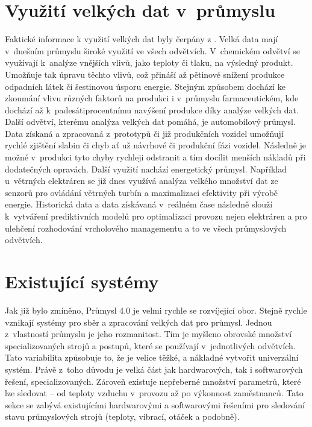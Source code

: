 \section{Využití velkých dat v~průmyslu}
Faktické informace k využití velkých dat byly čerpány z \cite{bigDataUse}. Velká data mají v~dnešním průmyslu široké využití ve všech odvětvích. V~chemickém odvětví se využívají k~analýze vnějších vlivů, jako teploty či tlaku, na výsledný produkt. Umožňuje tak úpravu těchto vlivů, což přináší až pětinové snížení produkce odpadních látek či šestinovou úsporu energie. Stejným způsobem dochází ke zkoumání vlivu různých faktorů na produkci i v~průmyslu farmaceutickém, kde dochází až k~padesátiprocentnímu navýšení produkce díky analýze velkých dat. Další odvětví, kterému analýza velkých dat pomáhá, je automobilový průmysl. Data získaná a zpracovaná z~prototypů či již produkčních vozidel umožňují rychlé zjištění slabin či chyb ať už návrhové či produkční fázi vozidel. Následně je možné v~produkci tyto chyby rychleji odstranit a tím docílit menších nákladů při dodatečných opravách. Další využití nachází energetický průmysl. Například u~větrných elektráren se již dnes využívá analýza velkého množství dat ze senzorů pro ovládání větrných turbín a maximalizaci efektivity při výrobě energie. Historická data a data získávaná v~reálném čase následně slouží k~vytváření prediktivních modelů pro optimalizaci provozu nejen elektráren a pro ulehčení rozhodování vrcholového managementu a to ve všech průmyslových odvětvích. 


\section{Existující systémy}
Jak již bylo zmíněno, Průmysl 4.0 je velmi rychle se rozvíjející obor. Stejně rychle vznikají systémy pro sběr a zpracování velkých dat pro průmysl. Jednou z~vlastností průmyslu je jeho rozmanitost. Tím je myšleno obrovské množství specializovaných strojů a postupů, které se používají v~jednotlivých odvětvích. Tato variabilita způsobuje to, že je velice těžké, a nákladné vytvořit univerzální systém. Právě z~toho důvodu je velká část jak hardwarových, tak i softwarových řešení, specializovaných. Zároveň existuje nepřeberné množství parametrů, které lze sledovat -- od teploty vzduchu v~provozu až po výkonnost zaměstnanců. Tato sekce se zabývá existujícími hardwarovými a softwarovými řešeními pro sledování stavu průmyslových strojů (teploty, vibrací, otáček a podobně).


